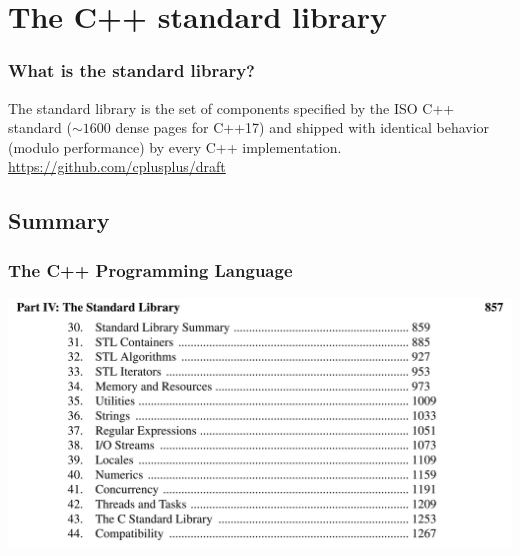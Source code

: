 \section{The C++ standard library}
\begin{frame}
  \frametitle{What is the standard library?}
  The standard library is the set of components specified by the ISO C++ standard ($\sim 1600$ dense pages for C++17) and shipped with identical behavior (modulo performance) by every C++ implementation.
  \vfill
  \url{https://github.com/cplusplus/draft}
\end{frame}
\subsection{Summary}
\begin{frame}
  \frametitle{The C++ Programming Language}
  \centering
  \includegraphics[height=0.7\textheight]{img/summary.png}
\end{frame}

